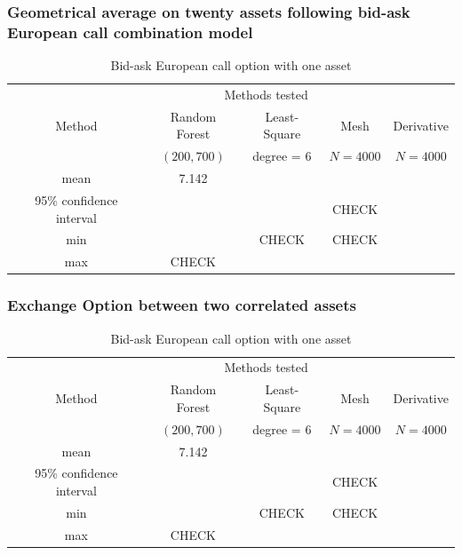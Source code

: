 \documentclass[english,11pt,openany]{article}
\theoremstyle{definition}
\theoremstyle{plain}
\theoremstyle{definition}
\begin{document}
	\subsubsection{Geometrical average on twenty assets following bid-ask European call combination model}
	
	\begin{table}[!h]
		\centering
		\caption{Bid-ask European call option with one asset}\label{table:1}
		\begin{tabular}{*5c}
			\toprule
			& \multicolumn{3}{c}{Methods tested} \\
			\cmidrule(lr){2-4}
			Method & Random Forest  & Least-Square & Mesh & Derivative \\    
			& $(200, 700)$ & degree = $6$     & $N = 4 000$ &  $N = 4 000$ \\
			\midrule
			mean &     7.142   &  &       \\ 
			95\% confidence interval &        &        & CHECK \\
			min &        & CHECK & CHECK \\
			max & CHECK &        &        \\
			\bottomrule
		\end{tabular}
	\end{table}
	
	\subsubsection{Exchange Option between two correlated assets}
	
	\begin{table}[!h]
		\centering
		\caption{Bid-ask European call option with one asset}\label{table:1}
		\begin{tabular}{*5c}
			\toprule
			& \multicolumn{3}{c}{Methods tested} \\
			\cmidrule(lr){2-4}
			Method & Random Forest  & Least-Square & Mesh & Derivative \\    
			& $(200, 700)$ & degree = $6$     & $N = 4 000$ &  $N = 4 000$ \\
			\midrule
			mean &     7.142   &  &       \\ 
			95\% confidence interval &        &        & CHECK \\
			min &        & CHECK & CHECK \\
			max & CHECK &        &        \\
			\bottomrule
		\end{tabular}
	\end{table}
	
\end{document}
